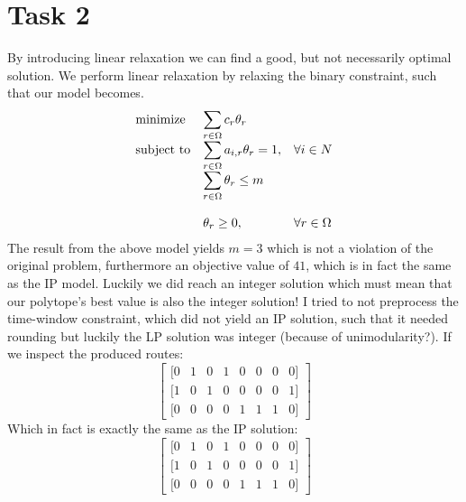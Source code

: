 \documentclass{article}
\begin{document}
    \clearpage
    \section*{Task 2}
    By introducing linear relaxation we can find a good, but not necessarily optimal solution.
    We perform linear relaxation by relaxing the binary constraint, such that our model becomes.
    \begin{equation*}
        \begin{array}{ll@{}ll}
            \text{minimize}  & \displaystyle\sum_{r \in \Omega} c_r \theta_r& &\\
            \text{subject to}& \displaystyle\sum_{r \in \Omega} a_{i, r} \theta_r = 1 ,&   &\forall i \in N\\
            & \displaystyle\sum_{r \in \Omega} \theta_r \leq m &&\\\\
            & \displaystyle \theta_r  \geq 0,  && \forall r \in \Omega
        \end{array}
    \end{equation*}
    The result from the above model yields $m = 3$ which is not a violation of the original problem, furthermore an objective value of $41$, which is in fact the same as the IP model.
    Luckily we did reach an integer solution which must mean that our polytope's best value is also the integer solution!
    I tried to not preprocess the time-window constraint, which did not yield an IP solution, such that it needed rounding but luckily the LP solution was integer (because of unimodularity?).
    If we inspect the produced routes:
    \[
    \begin{bmatrix}
        [0 & 1 & 0 & 1 & 0 & 0 & 0 & 0]\\
        [1 & 0 & 1 & 0 & 0 & 0 & 0 & 1]\\
        [0 & 0 & 0 & 0 & 1 & 1 & 1 & 0]
    \end{bmatrix}
    \]
    Which in fact is exactly the same as the IP solution:
    \[
        \begin{bmatrix}
            [0 & 1 & 0 & 1 & 0 & 0 & 0 & 0]\\
            [1 & 0 & 1 & 0 & 0 & 0 & 0 & 1]\\
            [0 & 0 & 0 & 0 & 1 & 1 & 1 & 0]
        \end{bmatrix}
    \]
\end{document}

